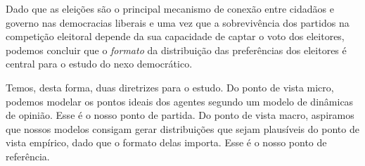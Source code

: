 Dado que as eleições são o principal mecanismo de conexão entre cidadãos e
governo nas democracias liberais \cite{dahl1989democracy} e uma vez que a
sobrevivência dos partidos na competição eleitoral depende da sua capacidade de
captar o voto dos eleitores, podemos concluir que o \textit{formato} da
distribuição das preferências dos eleitores é central para o estudo do nexo
democrático.

Temos, desta forma, duas diretrizes para o estudo. Do ponto de vista micro,
podemos modelar os pontos ideais dos agentes segundo um modelo de dinâmicas de
opinião. Esse é o nosso ponto de partida. Do ponto de vista macro, aspiramos que
nossos modelos consigam gerar distribuições que sejam plausíveis do ponto de
vista empírico, dado que o formato delas importa. Esse é o nosso ponto de
referência.






